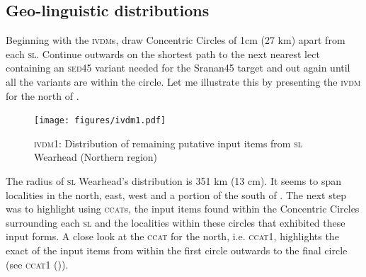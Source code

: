 \subsection{Geo-linguistic distributions}
Beginning with the \textsc{\textsc{ivdm}}s, draw Concentric Circles of 1cm (27 km) apart from each  \textsc{sl}. Continue outwards on the shortest path to the next nearest lect containing an  \textsc{sed45} variant needed for the  Sranan45 target and out again until all the variants are within the circle. Let me illustrate this by presenting the \textsc{\textsc{ivdm}} for the north of .

\begin{figure}
\texttt{[image: figures/ivdm1.pdf]}
\renewcommand{\thefigure}{\arabic{figure}.5a}
\caption{\textsc{ivdm1}: Distribution of remaining putative input items from \textsc{sl} Wearhead (Northern region)} 
\label{Map5.5a}
\end{figure}


The radius of \textsc{sl} Wearhead's distribution is 351 km (13 cm). It seems to span localities in the north, east, west and a portion of the south of . The next step was to highlight using \textsc{ccat}s, the input items found within the Concentric Circles surrounding each  \textsc{sl} and the localities within these circles that exhibited these input forms. A close look at the \textsc{ccat} for the north, i.e. \textsc{ccat1}, highlights the exact  of the input items from within the first circle outwards to the final circle (see \textsc{\textsc{ccat}1} ()).

